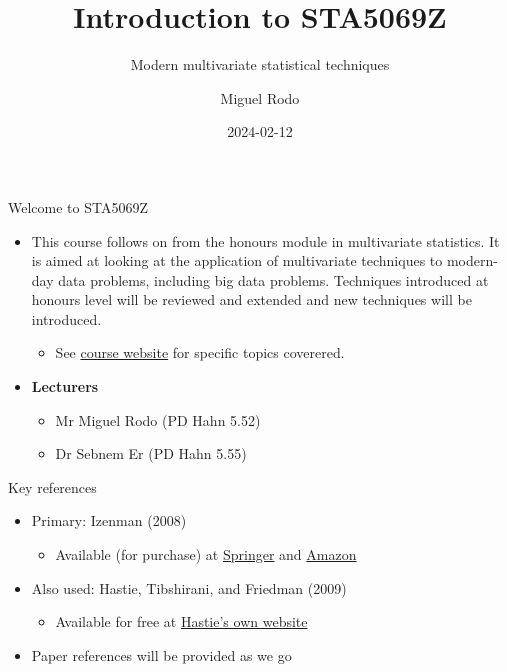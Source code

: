 \documentclass[
  ignorenonframetext,
  aspectratio=169,
]{beamer}
\title{Introduction to STA5069Z}
\subtitle{Modern multivariate statistical techniques}
\author{Miguel Rodo}
\date{2024-02-12}
\providecommand{\tightlist}{%
  \setlength{\itemsep}{0pt}\setlength{\parskip}{0pt}}\usepackage{longtable,booktabs,array}
\begin{document}
\frame{\titlepage}
\ifdefined\Shaded\renewenvironment{Shaded}{\begin{tcolorbox}[boxrule=0pt, sharp corners, interior hidden, frame hidden, enhanced, breakable, borderline west={3pt}{0pt}{shadecolor}]}{\end{tcolorbox}}\fi

\begin{frame}{Welcome to STA5069Z}
\protect\hypertarget{welcome-to-sta5069z}{}
\begin{itemize}
\tightlist
\item
  This course follows on from the honours module in multivariate
  statistics. It is aimed at looking at the application of multivariate
  techniques to modern-day data problems, including big data problems.
  Techniques introduced at honours level will be reviewed and extended
  and new techniques will be introduced.

  \begin{itemize}
  \tightlist
  \item
    See
    \href{https://sebnemer.github.io/english/courses/multivariate/}{course
    website} for specific topics coverered.
  \end{itemize}
\item
  \textbf{Lecturers}

  \begin{itemize}
  \tightlist
  \item
    Mr Miguel Rodo (PD Hahn 5.52)
  \item
    Dr Sebnem Er (PD Hahn 5.55)
  \end{itemize}
\end{itemize}

\addtocounter{framenumber}{-1}
\end{frame}

\begin{frame}{Key references}
\protect\hypertarget{key-references}{}
\begin{itemize}
\tightlist
\item
  Primary: Izenman (2008)

  \begin{itemize}
  \tightlist
  \item
    Available (for purchase) at
    \href{https://www.springer.com/gp/book/9780387781884}{Springer} and
    \href{https://www.amazon.com/Modern-Multivariate-Statistical-Techniques-Classification/dp/0387781889}{Amazon}
  \end{itemize}
\item
  Also used: Hastie, Tibshirani, and Friedman (2009)

  \begin{itemize}
  \tightlist
  \item
    Available for free at
    \href{https://hastie.su.domains/ElemStatLearn/}{Hastie's own
    website}
  \end{itemize}
\item
  Paper references will be provided as we go
\end{itemize}
\end{frame}
\end{document}
